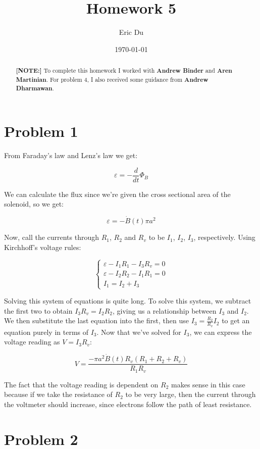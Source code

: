 \documentclass{article}
\title{Homework 5}
\author{Eric Du}
\date{\today}
\theoremstyle{definition}
\numberwithin{equation}{section}
\numberwithin{definition}{section}
\begin{document}
\maketitle

\begin{abstract}
\noindent \textbf{[NOTE:]} To complete this homework I worked with \textbf{Andrew Binder} and \textbf{Aren Martinian}. For problem 4, I also received some guidance from \textbf{Andrew Dharmawan}.
\end{abstract}

\section{Problem 1}
From Faraday's law and Lenz's law we get: 

\[ \varepsilon = -\frac{d}{dt} \Phi_B\]

We can calculate the flux since we're given the cross sectional area of the solenoid, so we get: 

\[ \varepsilon = -\dot B(t) \pi a^2\]

Now, call the currents through $R_1$, $R_2$ and $R_v$ to be $I_1$, $I_2$, $I_3$, respectively. Using Kirchhoff's voltage rules: 

\[\begin{cases}
\varepsilon - I_1R_1 - I_3R_v = 0\\
\varepsilon - I_2R_2 - I_1R_1 = 0\\
I_1 = I_2 + I_3
\end{cases}\]

Solving this system of equations is quite long. To solve this system, we subtract the first two to obtain $I_3 R_v = I_2R_2$, giving us a relationship between $I_3$ and $I_2$. We then substitute the last equation into the first, then use $I_3 = \frac{R_2}{R_v} I_2$ to get an equation purely in terms of $I_3$. Now that we've solved for $I_3$, we can express the voltage reading as $V = I_3R_v$:

\[ V = \frac{-\pi a^2 \dot B(t) R_v (R_1 + R_2 + R_v)}{R_1R_v}\]

The fact that the voltage reading is dependent on $R_2$ makes sense in this case because if we take the resistance of $R_2$ to be very large, then the current through the voltmeter should increase, since electrons follow the path of least resistance. 


\section{Problem 2}
\end{document}
